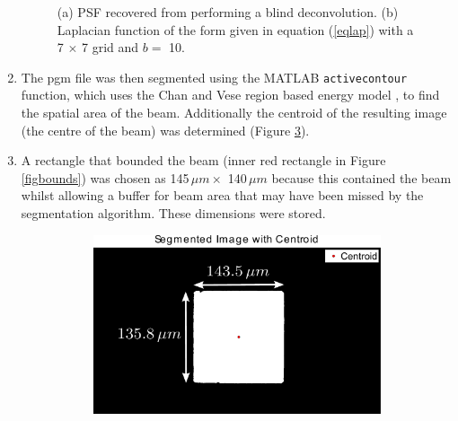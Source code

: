 \begin{enumerate}
\begin{figure}
\begin{subfigure}[b]{0.9\textwidth}
                \caption{}
                \label{figmodelpsf}
        \end{subfigure}
        \caption[Modelling of the point spread function.]{(a) PSF recovered from performing a blind deconvolution. (b) Laplacian function of the form given in equation (\ref{eqlap}) with a 7 $\times$ 7 grid and $b =$ 10.}
        \label{figpsfs}
\end{figure}
\item The pgm file was then segmented using the MATLAB \verb+activecontour+ function, which uses the Chan and Vese region based energy model \cite{chan2001}, to find the spatial area of the beam.
Additionally the centroid of the resulting image (the centre of the beam) was determined (Figure \ref{figcentroid}).
\item A rectangle that bounded the beam (inner red rectangle in Figure \ref{figbounds}) was chosen as 145$\, \mu m \times$ 140$\, \mu m$ because this contained the beam whilst allowing a buffer for beam area that may have been missed by the segmentation algorithm.
These dimensions were stored.
\begin{figure}
        \centering
        \begin{subfigure}[b]{0.9\textwidth}
                \centering
                \includegraphics[width=\textwidth]{figures/beam/seg_image.pdf}
                \caption{}
                \label{figcentroid}
        \end{subfigure}
				\\
        \begin{subfigure}[b]{0.9\textwidth}
                \centering

\end{subfigure}
\end{figure}
\end{enumerate}
